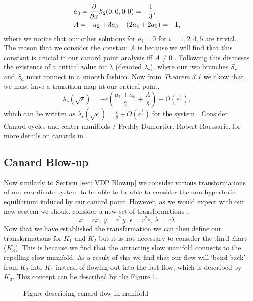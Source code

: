 \begin{align}
&a_3=\pd{}{x}h_2(0,0,0,0)=-\frac{1}{3},\\
&A=-a_2+3a_3-(2a_4+2a_5)=-1,
\end{align}
where we notice that our other solutions for $a_i=0$ for $i=1,2,4,5$ are trivial. The reason that we consider the constant $A$ is because we will find that this constant is crucial in our canard point analysis iff $A\neq 0$ \citep{krupa2001}. Following this \citep{krupa2001} discusses the existence of a critical value for $\lambda$ (denoted $\lambda_c$), where our two branches $S_r$ and $S_a$ must connect in a smooth fashion. Now from \textit{Theorem 3.1} we nkow that we must have a transition map at our critical point,
\begin{equation}
\lambda_c(\sqrt{\epsilon})=-\epsilon(\frac{a_1+a_5}{2}+\frac{A}{8})+O(\epsilon^\frac{3}{2}),
\end{equation}
which can be written as $\lambda_c(\sqrt{\epsilon})=\frac{\epsilon}{8}+O(\epsilon^\frac{3}{2})$ for the \vdp system \citep{krupa2001}. Consider Canard cycles and center manifolds / Freddy Dumortier, Robert Roussarie. for more details on canards in \vdp.


\subsection{Canard Blow-up}
Now similarly to Section \ref{sec: VDP Blowup} we consider various transformations of our coordinate system to be able to be able to consider the non-hyperbolic equilibrium induced by our canard point. However, as we would expect with our new system we should consider a new set of transformations \citep{krupa2001}.
\begin{equation}
x=\bar{r}\bar{x}, \ y=\bar{r}^2y, \ \epsilon=\bar{r}^2\bar{\epsilon}, \ \lambda=\bar{r}\bar{\lambda}
\end{equation}
Now that we have established the transformation we can then define our transformations for $K_1$ and $K_2$ but it is not necessary to consider the third chart ($K_3$). This is because we find that the attracting slow manifold connects to the repelling slow manifold. As a result of this we find that our flow will `bend back' from $K_2$ into $K_1$ instead of flowing out into the fast flow, which is described by $K_3$. This concept can be described by the Figure \ref{fig: flow in canard}.
\begin{figure}[h!]
	\centering
	\caption{Figure describing canard flow in manifold}
	\label{fig: flow in canard}
\end{figure}


